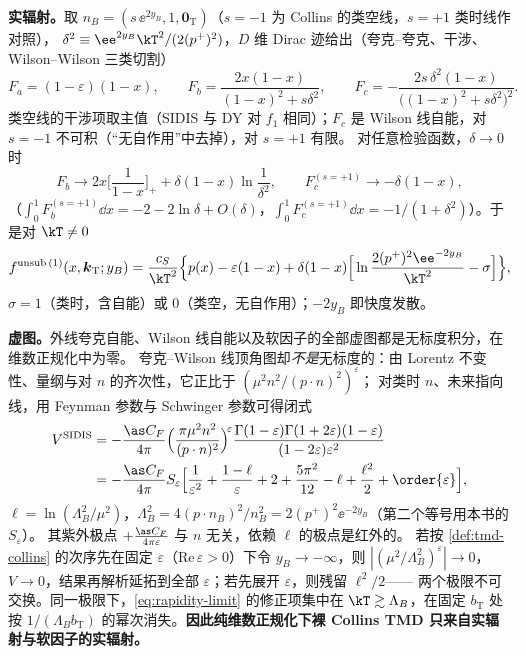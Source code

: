 \begin{example}
\textbf{实辐射。}取 $n_B=(s\,\ee^{2y_B},1,\boldsymbol 0_{\mathrm T})$（$s=-1$ 为 Collins 的类空线，$s=+1$ 类时线作对照），
$\delta^2\equiv\ee^{2y_B}\kT^2/(2(p^+)^2)$，$D$ 维 Dirac 迹给出（夸克--夸克、干涉、Wilson--Wilson 三类切割）
\begin{equation}
  F_a=(1-\varepsilon)(1-x),\qquad F_b=\frac{2x(1-x)}{(1-x)^2+s\delta^2},\qquad F_c=-\frac{2s\,\delta^2(1-x)}{\big((1-x)^2+s\delta^2\big)^2}.
  \label{eq:tmd-real-graphs}
\end{equation}
类空线的干涉项取主值（SIDIS 与 DY 对 $f_1$ 相同）；$F_c$ 是 Wilson 线自能，对 $s=-1$ 不可积（“无自作用”中去掉），对 $s=+1$ 有限。
对任意检验函数，$\delta\to0$ 时
\begin{equation}
  F_b\to2x\Big[\frac1{1-x}\Big]_++\delta(1-x)\ln\frac1{\delta^2},\qquad F_c^{(s=+1)}\to-\delta(1-x),
  \label{eq:rapidity-limit}
\end{equation}
（$\int_0^1F_b^{(s=+1)}\dd x=-2-2\ln\delta+O(\delta)$，$\int_0^1F_c^{(s=+1)}\dd x=-1/(1+\delta^2)$）。于是对 $\kT\neq0$
\begin{equation}
  f^{\mathrm{unsub}\,(1)}(x,\boldsymbol k_{\mathrm T};y_B)=\frac{c_S}{\kT^2}\Big\{p(x)-\varepsilon(1-x)+\delta(1-x)\Big[\ln\frac{2(p^+)^2\ee^{-2y_B}}{\kT^2}-\sigma\Big]\Big\},
  \label{eq:tmd-unsub-kspace}
\end{equation}
$\sigma=1$（类时，含自能）或 $0$（类空，无自作用）；$-2y_B$ 即快度发散。

\textbf{虚图。}外线夸克自能、Wilson 线自能以及软因子的全部虚图都是无标度积分，在维数正规化中为零。
夸克--Wilson 线顶角图却\emph{不是}无标度的：由 Lorentz 不变性、量纲与对 $n$ 的齐次性，它正比于 $(\mu^2n^2/(p\cdot n)^2)^\varepsilon$；
对类时 $n$、未来指向线，用 Feynman 参数与 Schwinger 参数可得闭式
\begin{equation}
  \begin{split}
  V^{\mathrm{SIDIS}}&=-\frac{\as C_F}{4\pi}\Big(\frac{\pi\mu^2n^2}{(p\cdot n)^2}\Big)^{\!\varepsilon}
  \frac{\Gamma(1-\varepsilon)\Gamma(1+2\varepsilon)(1-\varepsilon)}{(1-2\varepsilon)\varepsilon^2}\\
  &=-\frac{\as C_F}{4\pi}S_\varepsilon\Big[\frac1{\varepsilon^2}+\frac{1-\ell}{\varepsilon}+2+\frac{5\pi^2}{12}-\ell+\frac{\ell^2}2+\order{\varepsilon}\Big],
  \end{split}
  \label{eq:vertex-nonlightlike}
\end{equation}
$\ell=\ln(\Lambda_B^2/\mu^2)$，$\Lambda_B^2=4(p\cdot n_B)^2/n_B^2=2(p^+)^2\ee^{-2y_B}$（第二个等号用本书的 $S_\varepsilon$）。
其紫外极点 $+\frac{\as C_F}{4\pi\varepsilon}$ 与 $n$ 无关，依赖 $\ell$ 的极点是红外的。
若按 \cref{def:tmd-collins} 的次序先在固定 $\varepsilon$（$\mathrm{Re}\,\varepsilon>0$）下令 $y_B\to-\infty$，则
$|(\mu^2/\Lambda_B^2)^\varepsilon|\to0$，$V\to0$，结果再解析延拓到全部 $\varepsilon$；若先展开 $\varepsilon$，则残留 $\ell^2/2$——
两个极限不可交换。同一极限下，\eqref{eq:rapidity-limit} 的修正项集中在 $\kT\gtrsim\Lambda_B$，在固定 $b_{\mathrm T}$ 处按
$1/(\Lambda_Bb_{\mathrm T})$ 的幂次消失。\textbf{因此纯维数正规化下裸 Collins TMD 只来自实辐射与软因子的实辐射。}


\end{example}
